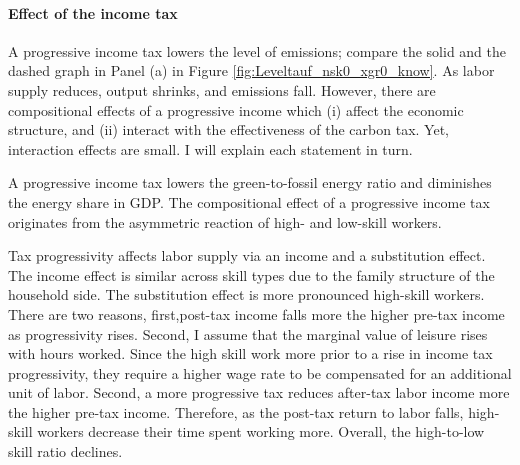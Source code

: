 \paragraph{Effect of the income tax}

 A progressive income tax lowers the level of emissions; compare the solid and the dashed graph in Panel (a) in Figure \ref{fig:Leveltauf_nsk0_xgr0_know}. As labor supply reduces, output shrinks, and emissions fall. 
 However, there are compositional effects of a progressive income which (i) affect the economic structure, and (ii) interact with the effectiveness of the carbon tax. Yet, interaction effects are small. I will explain each statement in turn. 
 
 A progressive income tax lowers the green-to-fossil energy ratio and diminishes the energy share in GDP. %
 The compositional effect of a progressive income tax originates from the asymmetric reaction of high- and low-skill workers. 
 
  Tax progressivity affects labor supply via an income and a substitution effect. 
 The income effect is similar across skill types due to the family structure of the household side.
 The substitution effect is more pronounced high-skill workers.
 There are two reasons, first,post-tax income falls more the higher pre-tax income as progressivity rises. 
 Second,  I assume that the marginal value of leisure rises with hours worked. Since the high skill work more prior to a rise in income tax progressivity, they require a higher wage rate to be compensated for an additional unit of labor. Second, a more progressive tax reduces after-tax labor income more the higher pre-tax income. %
 Therefore, as the post-tax return to labor falls, high-skill workers decrease their time spent working more.
 Overall, the high-to-low skill ratio declines. 
 
